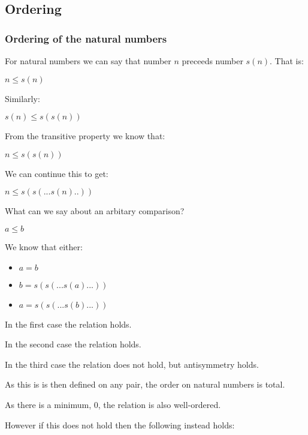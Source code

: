 
\subsection{Ordering}

\subsubsection{Ordering of the natural numbers}

For natural numbers we can say that number \(n\) preceeds number \(s(n)\). That is:

$n\le s(n)$

Similarly:

$s(n)\le s(s(n))$

From the transitive property we know that:

$n\le s(s(n))$

We can continue this to get:

$n\le s(s(...s(n)..))$

What can we say about an arbitary comparison?

$a\le b$

We know that either:

\begin{itemize}
\item $a=b$
\item $b=s(s(...s(a)...))$
\item $a=s(s(...s(b)...))$
\end{itemize}

In the first case the relation holds.

In the second case the relation holds.

In the third case the relation does not hold, but antisymmetry holds.

As this is is then defined on any pair, the order on natural numbers is total.

As there is a minimum, \(0\), the relation is also well-ordered.

However if this does not hold then the following instead holds:

